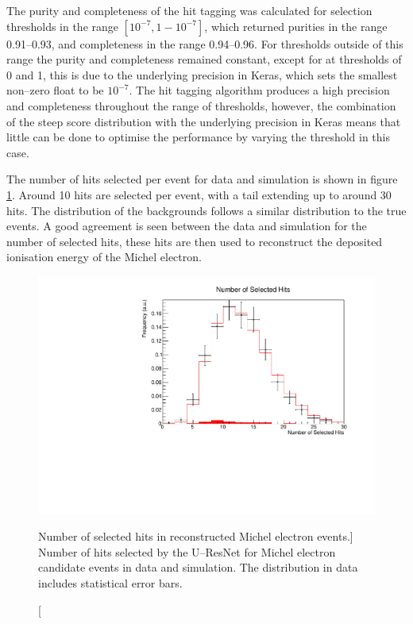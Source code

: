 The purity and completeness of the hit tagging was calculated for selection 
thresholds in the range $[10^{-7}, 1 - 10^{-7}]$, which returned purities in 
the range 0.91--0.93, and completeness in the range 0.94--0.96. For thresholds 
outside of this range the purity and completeness remained constant, except 
for at thresholds of 0 and 1, this is due to the underlying precision in 
Keras, which sets the smallest non--zero float to be $10^{-7}$. The hit 
tagging algorithm produces a high precision and completeness throughout the 
range of thresholds, however, the combination of the steep score distribution 
with the underlying precision in Keras means that little can be done to 
optimise the performance by varying the threshold in this case.

The number of hits selected per event for data and simulation is shown in
figure \ref{fig:mich_n_hits}. Around 10 hits are selected per event, with a
tail extending up to around 30 hits. The distribution of the backgrounds
follows a similar distribution to the true events. A good agreement is seen
between the data and simulation for the number of selected hits, these hits
are then used to reconstruct the deposited ionisation energy of the Michel
electron.
\begin{figure}
	\centering
	\includegraphics[width=\textwidth]{figures/mich_n_hits.pdf}
	\caption
	[Number of selected hits in reconstructed Michel electron events.]
	{Number of hits selected by the U--ResNet for Michel electron candidate
	events in data and simulation. The distribution in data includes statistical
	error bars.}
	\label{fig:mich_n_hits}
\end{figure}


